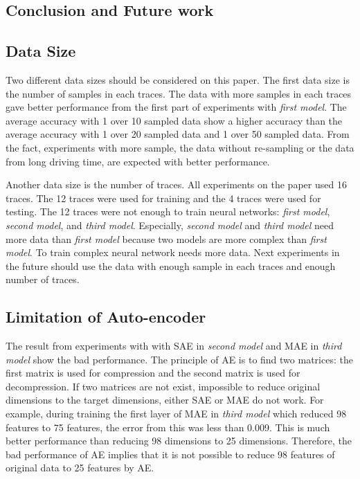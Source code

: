 \documentclass[draft,dvipsnames]{drexel-thesis}
\begin{document}
\begin{thesis}
\chapter{Conclusion and Future work}\label{chap:conclusion}
\section{Data Size}
Two different data sizes should be considered on this paper. The first data size is the number of samples in each traces. The data with more samples in each traces gave better performance from the first part of experiments with {\em first model}. The average accuracy with 1 over 10 sampled data show a higher accuracy than the average accuracy with 1 over 20 sampled data and 1 over 50 sampled data. From the fact, experiments with more sample, the data without re-sampling or the data from long driving time, are expected with better performance.

Another data size is the number of traces. All experiments on the paper used 16 traces. The 12 traces were used for training and the 4 traces were used for testing. The 12 traces were not enough to train neural networks: {\em first model}, {\em second model}, and {\em third model}. Especially, {\em second model} and {\em third model} need more data than {\em first model} because two models are more complex than {\em first model}. To train complex neural network needs more data. Next experiments in the future should use the data with enough sample in each traces and enough number of traces.

\section{Limitation of Auto-encoder}
The result from experiments with with SAE in {\em second model} and MAE in {\em third model} show the bad performance. The principle of AE is to find two matrices: the first matrix is used for compression and the second matrix is used for decompression. If two matrices are not exist, impossible to reduce original dimensions to the target dimensions, either SAE or MAE do not work. For example, during training the first layer of MAE in {\em third model} which reduced 98 features to 75 features, the error from this was less than 0.009. This is much better performance than reducing 98 dimensions to 25 dimensions. Therefore, the bad performance of AE implies that it is not possible to reduce 98 features of original data to 25 features by AE.


\end{thesis}
\end{document}
